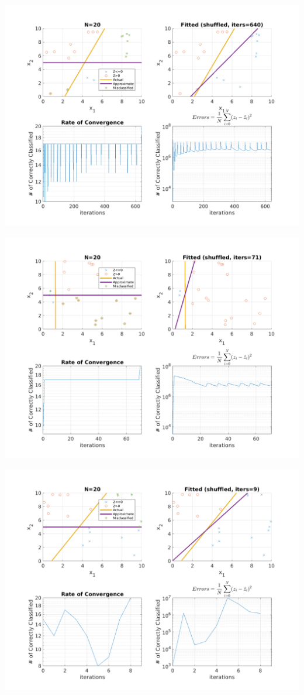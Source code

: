 \documentclass{article}
\newenvironment{Figure}
  {\par\medskip\noindent\minipage{\linewidth}}
  {\endminipage\par\medskip}
\begin{document}
\begin{multicols}{2}
\begin{Figure}
\centering
\includegraphics[width=\linewidth]{pngs/n20_shuffled1.png}
\end{Figure}
\begin{Figure}
\centering
\includegraphics[width=\linewidth]{pngs/n20_shuffled2.png}
\end{Figure}
\begin{Figure}
\centering
\includegraphics[width=\linewidth]{pngs/n20_shuffled3.png}

\end{Figure}
\end{multicols}
\end{document}
